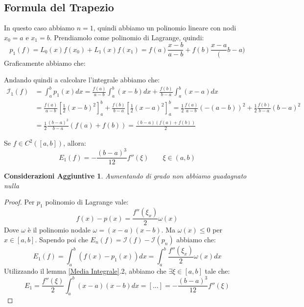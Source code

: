 \documentclass[11pt,a4paper,twoside]{article}
\newtheorem*{cons}{Considerazioni Aggiuntive}
\theoremstyle{definition}
\begin{document}
\subsection{Formula del Trapezio}

In questo caso abbiamo $n = 1$, quindi abbiamo un polinomio lineare con nodi $x_0 = a$ e $x_1 = b$. Prendiamolo come polinomio di Lagrange, quindi:
\[ p_1(f) = L_0(x)f(x_0) + L_1(x)f(x_1) = f(a)\frac{x-b}{a-b} + f(b)\frac{x-a}(b-a) \]
Graficamente abbiamo che:
\begin{center}
\end{center}
Andando quindi a calcolare l'integrale abbiamo che:
\begin{align*}
	\mathcal I_1(f) &= \int_a^b p_1(x)dx = \frac{f(a)}{a-b} \int_a^b(x-b)dx + \frac{f(b)}{b-a}\int_a^b(x-a)dx\\
	&= \frac{f(a)}{a-b} \left[ \frac 12(x-b)^2 \right]_a^b + \frac{f(b)}{b-a} \left[\frac 12 (x-a)^2\right]_a^b = \frac 12 \frac{f(a)}{a-b}\left(-(a-b)\right)^2 + \frac 12 \frac{f(b)}{b-a}(b-a)^2\\
	&= \frac 12 \frac{(b-a)^2}{b-a} (f(a) + f(b)) = \frac{(b-a)(f(a) + f(b))}2
\end{align*}

\begin{prop}{}{}
	Se $f \in C^2([a,b])$, allora:
	\[ E_1(f) = - \frac{(b-a)^3}{12} f''(\xi)\qquad \xi \in (a,b)\]
\end{prop}

\begin{cons}
	Aumentando di grado non abbiamo guadagnato nulla
\end{cons}

\begin{proof}
	Per $p_1$ polinomio di Lagrange vale:
	\[ f(x) - p(x) =\frac{f''(\xi_x)}{2} \omega(x) \]
	Dove $\omega$ è il polinomio nodale $\omega = (x-a)(x-b)$. Ma $\omega (x) \leq 0$ per $x \in [a,b]$.
	Sapendo poi che $E_n(f) = \mathcal I(f) - \mathcal I(p_n)$ abbiamo che:
	\[ E_1(f) = \int_a^b (f(x) - p_1(x))dx = \int_a^b \frac{f''(\xi_x)}2 \omega(x)dx \]
	Utilizzando il lemma \ref{Media Integrale}.2, abbiamo che $\exists \xi \in [a,b]$ tale che:
	\[ E_1 =  \frac{f''(\xi)}2 \int_a^b (x-a)(x-b)dx = [...] = -\frac{(b-a)^3}{12}f''(\xi)\]
\end{proof}
\end{document}
